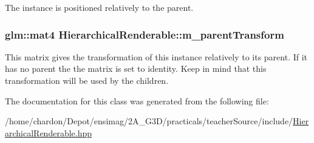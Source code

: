 The instance is positioned relatively to the parent. \hypertarget{classHierarchicalRenderable_a03c1fee357c0148132468224d3480d92}{
\subsubsection[{m\+\_\+parent\+Transform}]{\setlength{\rightskip}{0pt plus 5cm}glm\+::mat4 Hierarchical\+Renderable\+::m\+\_\+parent\+Transform\hspace{0.3cm}{\ttfamily [private]}}}\label{classHierarchicalRenderable_a03c1fee357c0148132468224d3480d92}
This matrix gives the transformation of this instance relatively to its parent. If it has no parent the the matrix is set to identity. Keep in mind that this transformation will be used by the children. 

The documentation for this class was generated from the following file\+:\begin{DoxyCompactItemize}
\item 
/home/chardon/\+Depot/ensimag/2\+A\+\_\+\+G3\+D/practicals/teacher\+Source/include/\hyperlink{HierarchicalRenderable_8hpp}{Hierarchical\+Renderable.\+hpp}\end{DoxyCompactItemize}
